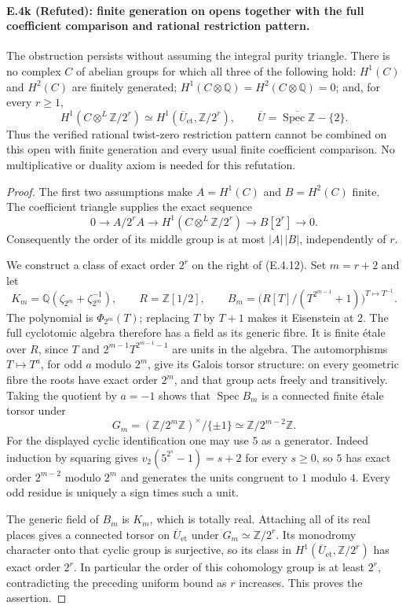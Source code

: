 \paragraph{E.4k (Refuted): finite generation on opens together with the full coefficient comparison and rational restriction pattern.}
The obstruction persists without assuming the integral purity triangle.
There is no complex $C$ of abelian groups for which all three of the
following hold: $H^1(C)$ and $H^2(C)$ are finitely generated;
$H^1(C\otimes\mathbb Q)=H^2(C\otimes\mathbb Q)=0$;
and, for every $r\geq1$,
\[
 H^1(C\otimes^L\mathbb Z/2^r)
      \simeq H^1(\overline U_{\mathrm{et}},\mathbb Z/2^r),
 \qquad \overline U=
 \overline{\operatorname{Spec}\mathbb Z}-\{2\}.
 \tag{E.4.12}
\]
Thus the verified rational twist-zero restriction pattern cannot be
combined on this open with finite generation and every usual finite
coefficient comparison. No multiplicative or duality axiom is needed
for this refutation.

\begin{proof}
The first two assumptions make $A=H^1(C)$ and $B=H^2(C)$ finite.
The coefficient triangle supplies the exact sequence
\[
 0\longrightarrow A/2^rA
   \longrightarrow H^1(C\otimes^L\mathbb Z/2^r)
   \longrightarrow B[2^r]\longrightarrow0.
\]
Consequently the order of its middle group is at most $|A|\,|B|$,
independently of $r$.

We construct a class of exact order $2^r$ on the right of (E.4.12).
Set $m=r+2$ and let
\[
 K_m=\mathbb Q(\zeta_{2^m}+\zeta_{2^m}^{-1}),\qquad
 R=\mathbb Z[1/2],\qquad
 B_m=\bigl(R[T]/(T^{2^{m-1}}+1)\bigr)^{T\mapsto T^{-1}}.
\]
The polynomial is $\Phi_{2^m}(T)$; replacing $T$ by $T+1$ makes
it Eisenstein at $2$. The full cyclotomic algebra therefore has a
field as its generic fibre. It is finite \'etale over $R$, since
$T$ and $2^{m-1}T^{2^{m-1}-1}$ are units in the algebra.
The automorphisms $T\mapsto T^a$, for odd $a$ modulo $2^m$, give
its Galois torsor structure: on every geometric fibre the roots have
exact order $2^m$, and that group acts freely and transitively.
Taking the quotient by $a=-1$ shows that $\operatorname{Spec}B_m$
is a connected finite \'etale torsor under
\[
 G_m=(\mathbb Z/2^m\mathbb Z)^\times/\{\pm1\}
       \simeq\mathbb Z/2^{m-2}\mathbb Z.
\]
For the displayed cyclic identification one may use $5$ as a generator.
Indeed induction by squaring gives
$v_2(5^{2^s}-1)=s+2$ for every $s\geq0$, so $5$ has exact order
$2^{m-2}$ modulo $2^m$ and generates the units congruent to $1$
modulo $4$. Every odd residue is uniquely a sign times such a unit.

The generic field of $B_m$ is $K_m$, which is totally real.
Attaching all of its real places gives a connected torsor on
$\overline U_{\mathrm{et}}$ under $G_m\simeq\mathbb Z/2^r$.
Its monodromy character onto that cyclic group is surjective,
so its class in $H^1(\overline U_{\mathrm{et}},\mathbb Z/2^r)$
has exact order $2^r$. In particular the order of this cohomology
group is at least $2^r$, contradicting the preceding uniform bound
as $r$ increases. This proves the assertion.
\end{proof}

